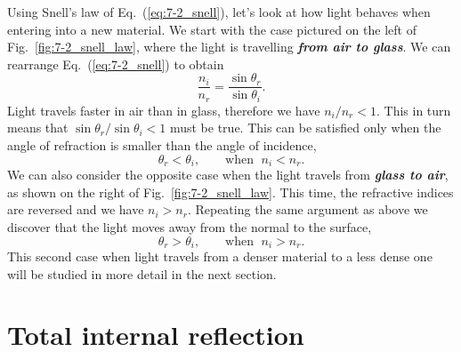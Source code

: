 Using Snell's law of Eq.~(\ref{eq:7-2_snell}), let's look at how light behaves when entering into a new material.
We start with the case pictured on the left of Fig.~\ref{fig:7-2_snell_law}, where the light is travelling \textit{\textbf{from air to glass}}.
We can rearrange Eq.~(\ref{eq:7-2_snell}) to obtain
\begin{equation}
    \frac{n_i}{n_r} = \frac{\sin\theta_r}{\sin\theta_i}.
\end{equation}
Light travels faster in air than in glass, therefore we have $n_i / n_r < 1$.
This in turn means that $\sin\theta_r / \sin\theta_i < 1$ must be true.
This can be satisfied only when the angle of refraction is smaller than the angle of incidence,
\begin{equation}
    \theta_r < \theta_i, \qquad \text{when } \; n_i < n_r.
\end{equation}
We can also consider the opposite case when the light travels from \textit{\textbf{glass to air}}, as shown on the right of Fig.~\ref{fig:7-2_snell_law}.
This time, the refractive indices are reversed and we have $n_i > n_r$.
Repeating the same argument as above we discover that the light moves away from the normal to the surface,
\begin{equation}
    \theta_r > \theta_i, \qquad \text{when } \; n_i > n_r.
\end{equation}
This second case when light travels from a denser material to a less dense one will be studied in more detail in the next section.


\section{Total internal reflection}


